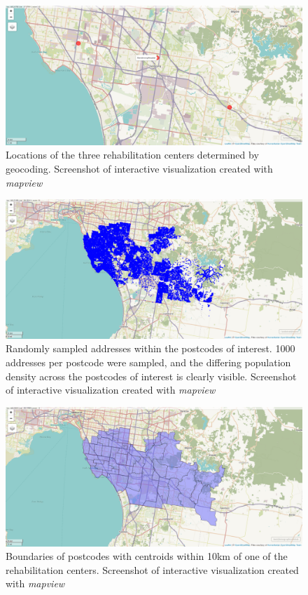 \documentclass[utf8]{frontiersHLTH}
\begin{document}
\begin{figure}[h!]
\begin{center}
\includegraphics[width=12cm]{map1_mv.png}
\end{center}
\caption{Locations of the three rehabilitation centers determined by geocoding. Screenshot of interactive visualization created with {\em mapview}}\label{fig:RehabCenterLocations}
\end{figure}

\begin{figure}[h!]
\begin{center}
\includegraphics[width=12cm]{map2_mv.png}
\end{center}
\caption{Randomly sampled addresses within the postcodes of interest. 1000 addresses per postcode were sampled, and the differing population density across the postcodes of interest is clearly visible. Screenshot of interactive visualization created with {\em mapview}}\label{fig:RehabCenterRandomAddresses}
\end{figure}

\begin{figure}[h!]
\begin{center}
\includegraphics[width=12cm]{map3_mv.png}
\end{center}
\caption{Boundaries of postcodes with centroids within 10km of one of the
  rehabilitation centers. Screenshot of interactive visualization created with {\em mapview}}\label{fig:RehabCenterPostcodes}
\end{figure}
\end{document}
